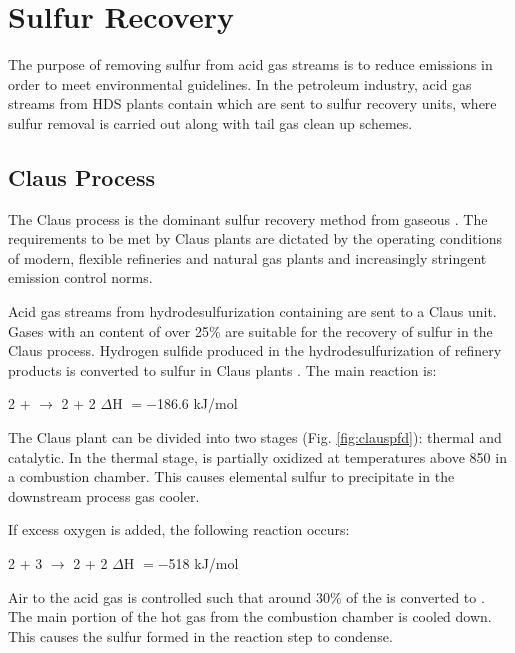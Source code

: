 \chapter{Sulfur Recovery}
\thispagestyle{plain}
The purpose of removing sulfur from acid gas streams is to reduce  emissions in order to meet environmental guidelines. In the petroleum industry, acid gas streams from HDS plants contain  which are sent to sulfur recovery units, where sulfur removal is carried out along with tail gas clean up schemes.


\section{Claus Process} \label{sec:claus}
The Claus process is the dominant sulfur recovery method from gaseous . The requirements to be met by Claus plants are dictated by the operating conditions of modern, flexible refineries and natural gas plants and increasingly stringent emission control norms.

Acid gas streams from hydrodesulfurization containing  are sent to a Claus unit. Gases with an  content of over 25\% are suitable for the recovery of sulfur in the Claus process. Hydrogen sulfide produced in the hydrodesulfurization of refinery products is converted to sulfur in Claus plants \citep{Fahim2010377}. The main reaction is:
\begin{center}
2 +  $\longrightarrow$ 2 + 2 \hspace{5em} $\Delta$H $= -$186.6 kJ/mol 
\end{center}
The Claus plant can be divided into two stages (Fig. \ref{fig:clauspfd}): thermal and catalytic. In the thermal stage,  is partially oxidized at temperatures above 850\textcelsius{} in a combustion chamber. This causes elemental sulfur to precipitate in the downstream process gas cooler.

If excess oxygen is added, the following reaction occurs:
\begin{center}
2 + 3 $\longrightarrow$ 2 + 2 \hspace{5em} $\Delta$H $= -$518 kJ/mol 
\end{center}
Air to the acid gas is controlled such that around 30\% of the  is converted to . %
The main portion of the hot gas from the combustion chamber is cooled down. This causes the sulfur formed in the reaction step to condense.

